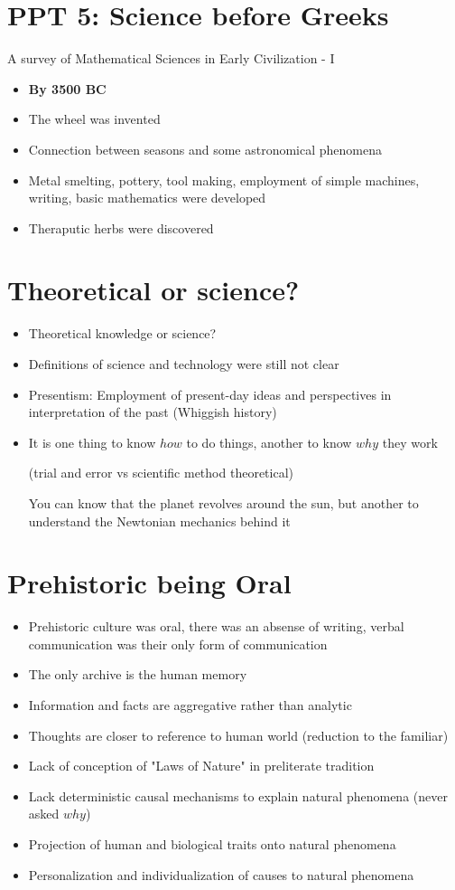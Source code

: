 \documentclass{article}
\begin{document}
\section{PPT 5: Science before Greeks}
A survey of Mathematical Sciences in Early Civilization - I
\begin{itemize}
  \item \textbf{By 3500 BC}
  \item The wheel was invented
  \item Connection between seasons and some astronomical phenomena
  \item Metal smelting, pottery, tool making, employment of simple machines,
    writing, basic mathematics were developed
  \item Theraputic herbs were discovered
\end{itemize}


\section*{Theoretical or science?}
\begin{itemize}
  \item Theoretical knowledge or science?
  \item Definitions of science and technology were still not clear
  \item Presentism: Employment of present-day ideas and perspectives
    in interpretation of the past (Whiggish history)
  \item It is one thing to know $how$ to do things,
    another to know $why$ they work

    (trial and error vs scientific method \rightarrow{} theoretical)

    You can know that the planet revolves around the sun, but another
    to understand the Newtonian mechanics behind it
\end{itemize}

\section*{Prehistoric being Oral}
\begin{itemize}
  \item Prehistoric culture was oral,
    there was an absense of writing, verbal communication was their only form of communication
  \item The only archive is the human memory
  \item Information and facts are aggregative rather than analytic
  \item Thoughts are closer to reference to human world (reduction to the familiar)
  \item Lack of conception of "Laws of Nature" in preliterate tradition
  \item Lack deterministic causal mechanisms to explain natural phenomena (never asked $why$)
  \item Projection of human and biological traits onto natural phenomena
  \item Personalization and individualization of causes to natural phenomena
\end{itemize}
\end{document}
